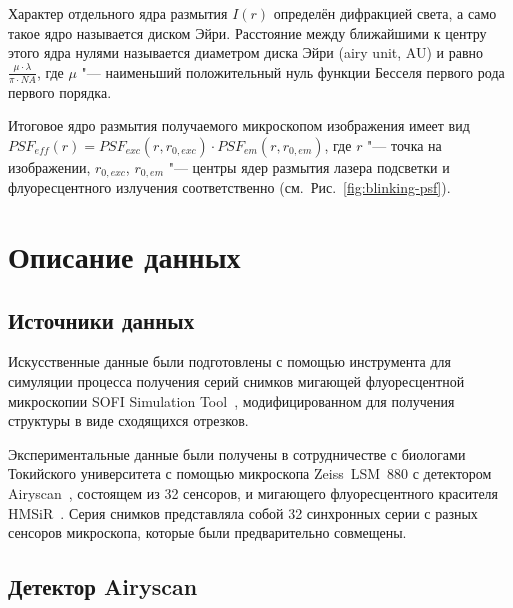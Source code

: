 Характер отдельного ядра размытия $I\left(r\right)$ определён дифракцией света, а само такое ядро называется диском Эйри. Расстояние между ближайшими к центру этого ядра нулями называется диаметром диска Эйри (airy unit, AU) и равно $\frac{\mu\cdot \lambda}{\pi \cdot NA}$, где $\mu$ "--- наименьший положительный нуль функции Бесселя первого рода первого порядка.

Итоговое ядро размытия получаемого микроскопом изображения имеет вид $PSF_{eff}\left(r\right)=PSF_{exc}\left(r,r_{0,exc}\right)\cdot PSF_{em}\left(r,r_{0,em}\right)$, где $r$ "--- точка на изображении, $r_{0,exc}$, $r_{0,em}$ "--- центры ядер размытия лазера подсветки и флуоресцентного излучения соответственно (см.~Рис.~\ref{fig:blinking-psf}).

\section{Описание данных}

\subsection{Источники данных}

Искусственные данные были подготовлены с помощью инструмента для симуляции процесса получения серий снимков мигающей флуоресцентной микроскопии SOFI Simulation Tool~\cite{10.1371/journal.pone.0161602}, модифицированном для получения структуры в виде сходящихся отрезков.

Экспериментальные данные были получены в сотрудничестве с биологами Токийского университета с помощью микроскопа Zeiss~LSM~880 с детектором Airyscan~\cite{weisshart2014basic}, состоящем из 32 сенсоров, и мигающего флуоресцентного красителя HMSiR~\cite{uno2014spontaneously}. Серия снимков представляла собой 32 синхронных серии с разных сенсоров микроскопа, которые были предварительно совмещены.

\subsection{Детектор Airyscan}


